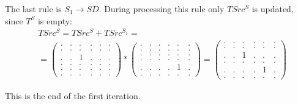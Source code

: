 The last rule is $S_1 \to S D$.
During processing this rule only $TSrc^S$ is updated, since $T^S$ is empty:
{
    \renewcommand{\arraystretch}{0.7}
    \setlength\arraycolsep{2pt}
\begin{align*}
&TSrc^S = TSrc^S + TSrc^{S_1} = \\ &=
\begin{pmatrix}
    . & . & . & . & . & . \\
    . & . & . & . & . & . \\
    . & . & 1 & . & . & . \\
    . & . & . & . & . & . \\
    . & . & . & . & . & . \\
    . & . & . & . & . & .
\end{pmatrix}*
\begin{pmatrix}
    . & . & . & . & . & . \\
    . & . & . & . & . & . \\
    . & . & . & . & . & . \\
    . & . & . & . & . & . \\
    . & . & . & . & 1 & . \\
    . & . & . & . & . & .
\end{pmatrix}=
\begin{pmatrix}
    . & . & . & . & . & . \\
    . & . & . & . & . & . \\
    . & . & 1 & . & . & . \\
    . & . & . & . & . & . \\
    . & . & . & . & 1 & . \\
    . & . & . & . & . & .
\end{pmatrix}
\end{align*}
}

This is the end of the first iteration.


